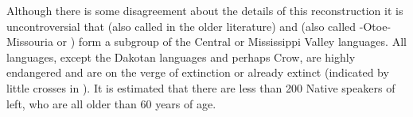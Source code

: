 \documentclass[output=paper]{langsci/langscibook}
\begin{document}


Although there is some disagreement about the details of this reconstruction it is uncontroversial that  (also called  in the older literature) and  (also called -Otoe-Missouria or ) form a subgroup of the Central  or Mississippi Valley  languages. All  languages, except the Dakotan languages and perhaps Crow, are highly endangered and are on the verge of extinction or already extinct (indicated by little crosses in ). It is estimated that there are less than 200 Native speakers of  left, who are all older than 60 years of age. 
\end{document}
